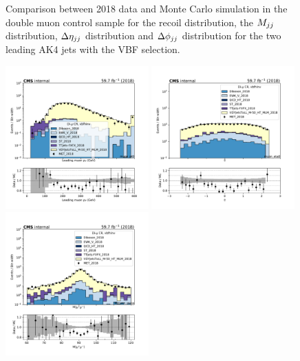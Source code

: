 \begin{figure}[htbp]
\begin{center}
    \end{center}
    \caption{Comparison between 2018 data and Monte Carlo simulation in the double muon control sample for
        the recoil distribution, the $M_{jj}$ distribution, $\Delta \eta_{jj}$ distribution and 
        $\Delta \phi_{jj}$ distribution for the two leading AK4 jets with the VBF selection.}
    \label{fig:DM_vbfhinv_2018}
\end{figure}

\begin{figure}[htbp]
    \begin{center}
        \includegraphics[width=0.49\textwidth]{fig/datamc/cr_2m_vbf/cr_2m_vbf_muon_pt0_losf_2018.pdf}
        \includegraphics[width=0.49\textwidth]{fig/datamc/cr_2m_vbf/cr_2m_vbf_muon_eta0_losf_2018.pdf} \\
        \includegraphics[width=0.49\textwidth]{fig/datamc/cr_2m_vbf/cr_2m_vbf_dimuon_mass_losf_2018.pdf}

\end{center}
\end{figure}
